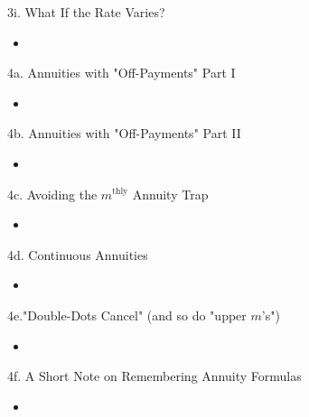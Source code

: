 \begin{CHPT_SUMM_AUTO}[label = {L.-3i}]{3i. What If the Rate Varies?}
	\begin{itemize}
		\item	
	\end{itemize}
\end{CHPT_SUMM_AUTO}

\begin{CHPT_SUMM_AUTO}[label = {L.-4a}]{4a. Annuities with "Off-Payments" Part I}
	\begin{itemize}
		\item	
	\end{itemize}
\end{CHPT_SUMM_AUTO}

\begin{CHPT_SUMM_AUTO}[label = {L.-4b}]{4b. Annuities with "Off-Payments" Part II}
	\begin{itemize}
		\item	
	\end{itemize}
\end{CHPT_SUMM_AUTO}

\begin{CHPT_SUMM_AUTO}[label = {L.-4c}]{4c. Avoiding the $m^{\text{thly}}$ Annuity Trap}
	\begin{itemize}
		\item	
	\end{itemize}
\end{CHPT_SUMM_AUTO}

\begin{CHPT_SUMM_AUTO}[label = {L.-4d}]{4d. Continuous Annuities}
	\begin{itemize}
		\item	
	\end{itemize}
\end{CHPT_SUMM_AUTO}

\begin{CHPT_SUMM_AUTO}[label = {L.-4e}]{4e."Double-Dots Cancel" (and so do "upper $m$'s")}
	\begin{itemize}
		\item	
	\end{itemize}
\end{CHPT_SUMM_AUTO}

\begin{CHPT_SUMM_AUTO}[label = {L.-4f}]{4f. A Short Note on Remembering Annuity Formulas}
	\begin{itemize}
		\item	
	\end{itemize}
\end{CHPT_SUMM_AUTO}

